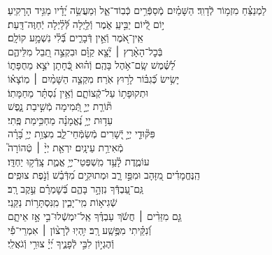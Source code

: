 \documentclass[twoside, openany, parskip=half, 11pt]{book}
\begin{document}
\begin{narrow}
לַמְנַצֵּ֗חַ מִזְמ֥וֹר לְֿדָוִֽד׃ \hfill \break
 הַשָּׁמַ֗יִם מְֽֿסַפְּֿרִ֥ים כְּֿבֽוֹד־אֵ֑ל \hfill וּֽמַעֲשֵׂ֥ה יָ֝דָ֗יו מַגִּ֥יד הָרָקִֽיעַ׃ \\
 י֣וֹם לְֿ֭יוֹם יַבִּ֣יעַֽ אֹ֑מֶר \hfill וְֿלַ֥יְלָה לְּֿ֝לַ֗יְלָה יְֿחַוֶּה־דָּֽעַת׃ \\
 אֵֽין־אֹ֭מֶר וְֿאֵ֣ין דְּֿבָרִ֑ים \hfill בְּֿ֝לִ֗י נִשְׁמָ֥ע קוֹלָֽם׃ \\
 בְּֿכׇל־הָאָ֨רֶץ ׀ יָ֘צָ֤א קַוָּ֗ם \hfill וּבִקְצֵ֣ה תֵ֭בֵל מִלֵּיהֶ֑ם \\
 לַ֝שֶּׁ֗מֶשׁ שָֽׂם־אֹ֥הֶל בָּהֶֽם׃ \hfill
 וְֿה֗וּא כְּֿ֭חָתָן יֹצֵ֣א מֵחֻפָּת֑וֹ\\
 יָשִׂ֥ישׂ כְּֿ֝גִבּ֗וֹר לָר֥וּץ אֹֽרַח׃ \hfill
 מִקְצֵ֤ה הַשָּׁמַ֨יִם ׀ מֽוֹצָא֗וֹ\\ וּתְקוּפָת֥וֹ עַל־קְֿצוֹתָ֑ם \hfill וְֿאֵ֥ין נִ֝סְתָּ֗ר מֵחַמָּתֽוֹ׃ \\
 תּ֘וֹרַ֤ת יְיָ֣ תְּֿ֭מִימָה \hfill מְֿשִׁ֣יבַת נָ֑פֶשׁ \\
 עֵד֥וּת יְיָ֥ נֶ֝אֱמָנָ֗ה \hfill מַחְכִּ֥ימַת פֶּֽתִי׃ \\
 פִּקּ֘וּדֵ֤י יְיָ֣ יְֿ֭שָׁרִים מְֿשַׂמְּֿחֵי־לֵ֑ב \hfill מִצְוַ֥ת יְיָ֥ בָּ֝רָ֗ה\\
 מְֿאִירַ֥ת עֵינָֽיִם׃ \hfill
 יִרְאַ֤ת יְיָ֨ ׀ טְֿהוֹרָה֮ \\
 עוֹמֶ֢דֶת לָ֫עַ֥ד \hfill מִֽשְׁפְּטֵי־יְיָ֥ אֱמֶ֑ת צָֽדְֿק֥וּ יַחְדָּֽו׃ \\
 הַֽנֶּחֱמָדִ֗ים מִ֭זָּהָב וּמִפַּ֣ז רָ֑ב \hfill וּמְתוּקִ֥ים מִ֝דְּֿבַ֗שׁ וְֿנֹ֣פֶת צוּפִֽים׃ \\
 גַּֽם־עַ֭בְדְּֿֿךָ נִזְהָ֣ר בָּהֶ֑ם \hfill בְּֿ֝שׇׁמְרָ֗ם עֵ֣קֶב רָֽב׃ \\
 שְֿׁגִיא֥וֹת מִֽי־יָבִ֑ין \hfill מִֽנִּסְתָּר֥וֹת נַקֵּֽנִי׃ \\
 גַּ֤ם מִזֵּדִ֨ים ׀ חֲשֹׂ֬ךְ עַבְדֶּ֗ךָ \hfill אַֽל־יִמְשְֿׁלוּ־בִ֣י אָ֣ז אֵיתָ֑ם \\
 וְֿ֝נִקֵּ֗יתִי מִפֶּ֥שַֽׁע רָֽב׃ \hfill
 יִ֥הְיֽוּ לְֿרָצ֨וֹן ׀ אִמְרֵי־פִ֡י\\
 וְֿהֶגְי֣וֹן לִבִּ֣י לְֿפָנֶ֑יךָ \hfill יְ֝יָ֗ צוּרִ֥י וְֿגֹאֲלִֽי׃ \\


\enlargethispage{\baselineskip}


\end{narrow}
\end{document}
